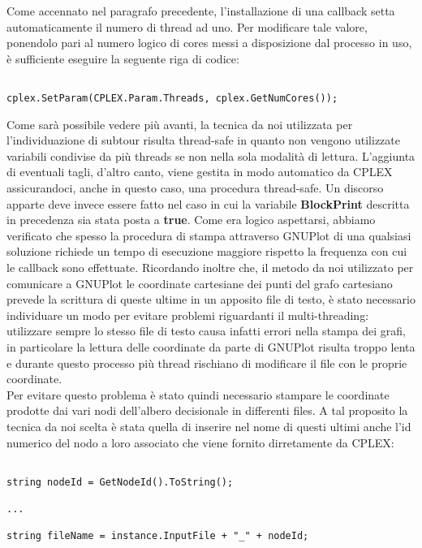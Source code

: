 \documentclass[11pt]{article}
\begin{document}
Come accennato nel paragrafo precedente, l'installazione di una callback setta automaticamente il numero di thread ad uno. Per modificare tale valore, ponendolo pari al numero logico di cores messi a disposizione dal processo in uso, è sufficiente eseguire la seguente riga di codice:

\begin{lstlisting}

cplex.SetParam(CPLEX.Param.Threads, cplex.GetNumCores());

\end{lstlisting}

Come sarà possibile vedere più avanti, la tecnica da noi utilizzata per l'individuazione di subtour risulta thread-safe in quanto non vengono utilizzate variabili condivise da più threads se non nella sola modalità di lettura. L'aggiunta di eventuali tagli, d'altro canto, viene gestita in modo automatico da CPLEX assicurandoci, anche in questo caso, una procedura thread-safe. Un discorso apparte deve invece essere fatto nel caso in cui la variabile \textbf{BlockPrint} descritta in precedenza sia stata posta a \textbf{true}. Come era logico aspettarsi, abbiamo verificato che spesso la procedura di stampa attraverso GNUPlot di una qualsiasi soluzione richiede un tempo di esecuzione maggiore rispetto la frequenza con cui le callback sono effettuate. Ricordando inoltre che, il metodo da noi utilizzato per comunicare a GNUPlot le coordinate cartesiane dei punti del grafo cartesiano prevede la scrittura di queste ultime in un apposito file di testo, è stato necessario individuare un modo per evitare problemi riguardanti il multi-threading: utilizzare sempre lo stesso file di testo causa infatti errori nella stampa dei grafi, in particolare la lettura delle coordinate da parte di GNUPlot risulta troppo lenta e durante questo processo più thread rischiano di modificare il file con le proprie coordinate.\\
Per evitare questo problema è stato quindi necessario stampare le coordinate prodotte dai vari nodi dell'albero decisionale in differenti files. A tal proposito la tecnica da noi scelta è stata quella di inserire nel nome di questi ultimi anche l'id numerico del nodo a loro associato che viene fornito dirretamente da CPLEX:


\begin{lstlisting}

string nodeId = GetNodeId().ToString();

...

string fileName = instance.InputFile + "_" + nodeId;

\end{lstlisting}
\end{document}

